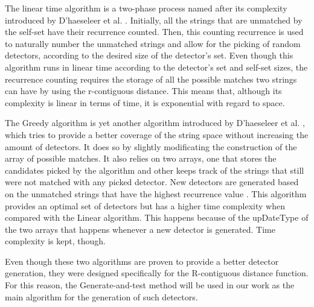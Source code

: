 The linear time algorithm is a two-phase process named after its complexity introduced by D'haeseleer et al. \cite{NSADetGen1996}. Initially, all the strings that are unmatched by the self-set have their recurrence counted. Then, this counting recurrence is used to naturally number the unmatched strings and allow for the picking of random detectors, according to the desired size of the detector's set. Even though this algorithm runs in linear time according to the detector's set and self-set sizes, the recurrence counting requires the storage of all the possible matches two strings can have by using the r-contiguous distance. This means that, although its complexity is linear in terms of time, it is exponential with regard to space. 

The Greedy algorithm is yet another algorithm introduced by D'haeseleer et al. \cite{NSADetGen1996}, which tries to provide a better coverage of the string space without increasing the amount of detectors. It does so by slightly modificating the construction of the array of possible matches. It also relies on two arrays, one that stores the candidates picked by the algorithm and other keeps track of the strings that still were not matched with any picked detector. New detectors are generated based on the unmatched strings that have the highest recurrence value \cite{ICBook2009}. This algorithm provides an optimal set of detectors but has a higher time complexity when compared with the Linear algorithm. This happens because of the upDateType of the two arrays that happens whenever a new detector is generated. Time complexity is kept, though.

Even though these two algorithms are proven to provide a better detector generation, they were designed specifically for the R-contiguous distance function. For this reason, the Generate-and-test method will be used in our work as the main algorithm for the generation of such detectors.





